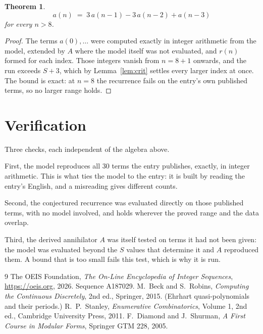 \documentclass[11pt,a4paper]{article}
\theoremstyle{plain}
\newtheorem{theorem}{Theorem}
\theoremstyle{definition}
\begin{document}
\begin{theorem}
\[
a(n)\;=\;3\,a(n-1) - 3\,a(n-2) + a(n-3)
\]
for every $n>8$.
\end{theorem}

\begin{proof}
The terms $a(0),\dots$ were computed exactly in integer arithmetic from the model, extended by
$A$ where the model itself was not evaluated, and $r(n)$ formed for each index. Those integers
vanish from $n=8+1$ onwards, and the run exceeds $S+3$, which by
Lemma~\ref{lem:crit} settles every larger index at once. The bound is exact: at $n=8$ the recurrence fails on the entry's own published terms, so no larger range holds.
\end{proof}

\section{Verification}

Three checks, each independent of the algebra above.

First, the model reproduces all $30$ terms the entry publishes, exactly, in integer
arithmetic. This is what ties the model to the entry: it is built by reading the entry's
English, and a misreading gives different counts.

Second, the conjectured recurrence was evaluated directly on those published terms, with no
model involved, and holds wherever the proved range and the data overlap.

Third, the derived annihilator $A$ was itself tested on terms it had not been given: the model
was evaluated beyond the $S$ values that determine it and $A$ reproduced them. A bound that is
too small fails this test, which is why it is run.

\begin{thebibliography}{9}
 The OEIS Foundation, \emph{The On-Line Encyclopedia of Integer
Sequences}, \url{https://oeis.org}, 2026. Sequence A187029.
 M.~Beck and S.~Robins, \emph{Computing the Continuous Discretely},
2nd ed., Springer, 2015. (Ehrhart quasi-polynomials and their periods.)
 R.~P.~Stanley, \emph{Enumerative Combinatorics}, Volume 1, 2nd ed.,
Cambridge University Press, 2011.
 F.~Diamond and J.~Shurman, \emph{A First Course in Modular Forms},
Springer GTM 228, 2005.
\end{thebibliography}
\end{document}
